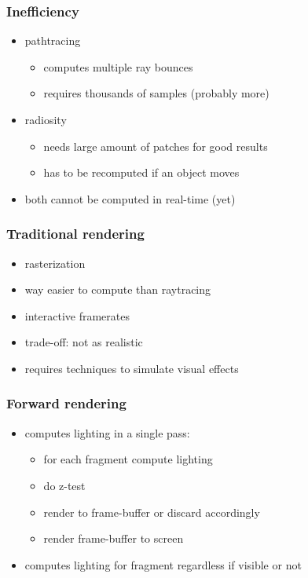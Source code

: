 \documentclass[aspectratio=169]{beamer}
\begin{document}
	\begin{frame}
		\frametitle{Inefficiency}
		\begin{itemize}
			\item pathtracing 
				\begin{itemize}
					\item computes multiple ray bounces
					\item requires thousands of samples (probably more) 
				\end{itemize}
			\item radiosity
				\begin{itemize}
					\item needs large amount of patches for good results
					\item has to be recomputed if an object moves
				\end{itemize}
			\item both cannot be computed in real-time (yet)
		\end{itemize}
	\end{frame}

	\begin{frame}
		\frametitle{Traditional rendering}
		\begin{itemize}
			\item rasterization
			\item way easier to compute than raytracing
			\item interactive framerates
			\item trade-off: not as realistic
			\item requires techniques to simulate visual effects
		\end{itemize}
	\end{frame}

	\begin{frame}
		\frametitle{Forward rendering}
		\begin{itemize}
			\item computes lighting in a single pass:
				\begin{itemize}
					\item for each fragment compute lighting
					\item do z-test
					\item render to frame-buffer or discard accordingly
					\item render frame-buffer to screen
				\end{itemize}
			\item computes lighting for fragment regardless if visible or not
		\end{itemize}
	\end{frame}
\end{document}
